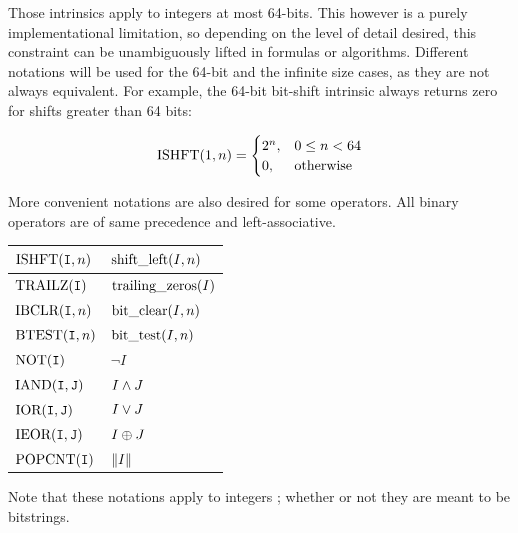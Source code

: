 \documentclass[./thesis.tex]{subfiles}
\begin{document}
      
Those intrinsics apply to integers at most 64-bits. This however is a purely implementational limitation, so depending on the level of detail desired, this constraint can be unambiguously lifted in formulas or algorithms. Different notations will be used for the 64-bit and the infinite size cases, as they are not always equivalent.
For example, the 64-bit bit-shift intrinsic always returns zero for shifts greater than 64 bits:

$$ \ISHFT{1}{n} =
\begin{cases}
2^{n}, & 0 \le n < 64 \\
0, & \text{otherwise}
\end{cases}
$$

More convenient notations are also desired for some operators. All binary operators are of same precedence and left-associative.

\begin{table}[H]
	\begin{tabularx}{\textwidth}{X|X}
		\hline
		
		\hline
		\rule{0pt}{3ex}
		$\ISHFT{\bitI}{n}$ & $\text{shift\_left}(I,n)$  \\ 
		
		\hline
		\rule{0pt}{3ex}
		$\TRAILZ{\bitI}$ & $\text{trailing\_zeros}(I)$  \\ 
		
		\hline
		\rule{0pt}{3ex}
		$\IBCLR{\bitI}{n}$ & $\text{bit\_clear}(I,n)$  \\ 
		
		\hline
		\rule{0pt}{3ex}
		$\BTEST{\bitI}{n}$ & $\text{bit\_test}(I,n)$  \\ 
		
		\hline
		\rule{0pt}{3ex}
		$\NOT{\bitI}$ & $\neg I $  \\ 
		
		\hline
		\rule{0pt}{3ex}
		$\IAND{\bitI}{\bitJ}$ & $I \wedge J$ \\
		
		\hline
		\rule{0pt}{3ex}
		$\IOR{\bitI}{\bitJ}$ & $I \vee J$ \\
		
		\hline
		\rule{0pt}{3ex}
		$\IEOR{\bitI}{\bitJ}$ & $I \oplus J$ \\
		
		\hline
		\rule{0pt}{3ex}
		$\POPCNT{\bitI}$ & $\norm{I}$ \\
		\hline
	\end{tabularx}
\end{table}

Note that these notations apply to integers ; whether or not they are meant to be bitstrings.
\end{document}
